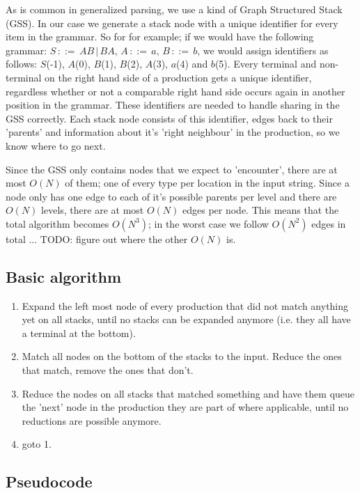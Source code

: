 \documentclass[a4paper,10pt]{article}
\begin{document}
As is common in generalized parsing, we use a kind of Graph Structured Stack (GSS). In our case we generate a stack node with a unique identifier for every item in the grammar. So for for example; if we would have the following grammar: $S\,::=\,AB\,|\,BA,\,A\,::=\,a,\,B\,::=\,b$, we would assign identifiers as follows: $S$(-1), $A$(0), $B$(1), $B$(2), $A$(3), $a$(4) and $b$(5). Every terminal and non-terminal on the right hand side of a production gets a unique identifier, regardless whether or not a comparable right hand side occurs again in another position in the grammar. These identifiers are needed to handle sharing in the GSS correctly. Each stack node consists of this identifier, edges back to their 'parents' and information about it's 'right neighbour' in the production, so we know where to go next.

Since the GSS only contains nodes that we expect to 'encounter', there are at most $O(N)$ of them; one of every type per location in the input string. Since a node only has one edge to each of it's possible parents per level and there are $O(N)$ levels, there are at most $O(N)$ edges per node. This means that the total algorithm becomes $O(N^3)$; in the worst case we follow $O(N^2)$ edges in total ... TODO: figure out where the other $O(N)$ is.

\subsection{Basic algorithm}

\begin{enumerate}
 \setlength{\itemsep}{0pt}
 \setlength{\parskip}{0pt}
 \setlength{\parsep}{0pt}

 \item Expand the left most node of every production that did not match anything yet on all stacks, until no stacks can be expanded anymore (i.e. they all have a terminal at the bottom).
 \item Match all nodes on the bottom of the stacks to the input. Reduce the ones that match, remove the ones that don't.
 \item Reduce the nodes on all stacks that matched something and have them queue the 'next' node in the production they are part of where applicable, until no reductions are possible anymore.
 \item goto 1.
\end{enumerate}

\subsection{Pseudocode}
\end{document}
